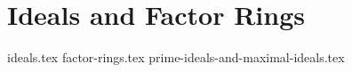 \chapter{Ideals and Factor Rings}
{ideals.tex}
{factor-rings.tex}
{prime-ideals-and-maximal-ideals.tex}
